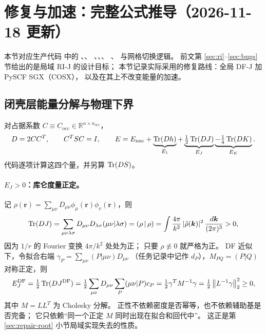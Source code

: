 \section{修复与加速：完整公式推导（2026-11-18 更新）}
\label{sec:repair}
本节对应生产代码  中的
、、
、、、
、 与网格切换逻辑。
前文第 \ref{sec:ri}--\ref{sec:bugs} 节给出的是局域 RI-J 的设计目标；
本节记录实际采用的修复路线：全局 DF-J 加 PySCF SGX（COSX），
以及在其上不改变能量的加速。

\subsection{闭壳层能量分解与物理下界}
\label{sec:repair-energy}
对占据系数 \(C\equiv C_{\mathrm{occ}}\in\mathbb R^{n\times n_{\mathrm{occ}}}\)，
\begin{equation}
D=2CC^T,\qquad C^TSC=I,\qquad
E=E_{\mathrm{nuc}}+\underbrace{\operatorname{Tr}(Dh)}_{E_1}
+\underbrace{\tfrac12\operatorname{Tr}(DJ)}_{E_J}
\underbrace{-\tfrac14\operatorname{Tr}(DK)}_{E_K}.
\label{eq:rep-energy}
\end{equation}
代码逐项计算这四个量，并另算 \(\operatorname{Tr}(DS)\)。

\paragraph{\(E_J>0\)：库仑度量正定。}
记 \(\rho(\bm r)=\sum_{\mu\nu}D_{\mu\nu}\phi_\mu(\bm r)\phi_\nu(\bm r)\)，则
\begin{equation}
\operatorname{Tr}(DJ)=\sum_{\mu\nu\lambda\sigma}D_{\mu\nu}D_{\lambda\sigma}(\mu\nu|\lambda\sigma)
=\left(\rho\,\middle|\,\rho\right)
=\int\frac{4\pi}{k^2}\,|\hat\rho(\bm k)|^2\,\frac{d\bm k}{(2\pi)^3}>0,
\label{eq:rep-ej}
\end{equation}
因为 \(1/r\) 的 Fourier 变换 \(4\pi/k^2\) 处处为正；
只要 \(\rho\not\equiv0\) 就严格为正。
DF 近似下，令拟合右端
\(\gamma_P=\sum_{\mu\nu}(P|\mu\nu)D_{\mu\nu}\)
（任务记录中记作 \(d_P\)），\(M_{PQ}=(P|Q)\) 对称正定，则
\begin{equation}
E_J^{\mathrm{DF}}=\tfrac12\operatorname{Tr}(DJ^{\mathrm{DF}})
=\tfrac12\sum_{\mu\nu}D_{\mu\nu}\sum_P(\mu\nu|P)c_P
=\tfrac12\gamma^TM^{-1}\gamma
=\tfrac12\left\lVert L^{-1}\gamma\right\rVert_2^2\geq0,
\label{eq:rep-ejdf}
\end{equation}
其中 \(M=LL^T\) 为 Cholesky 分解。
正性不依赖密度是否幂等，也不依赖辅助基是否完备；
它只依赖“同一个正定 \(M\) 同时出现在拟合和回代中”。
这正是第 \ref{sec:repair-root} 小节局域实现失去的性质。

